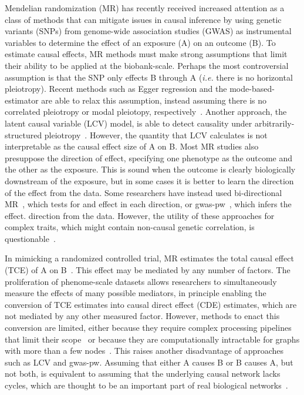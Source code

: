 \documentclass{article}
\begin{document}
Mendelian randomization (MR) has recently received increased attention as a class of methods
that can mitigate issues in causal inference
 by using genetic variants (SNPs) from genome-wide
association studies (GWAS) as instrumental variables to determine the effect
of an exposure (A) on an outcome (B). To estimate causal effects,
MR methods must make strong assumptions that limit their
ability to be applied at the biobank-scale. Perhaps the most
controversial assumption is that the SNP only effects B through A
(\textit{i.e.} there is no horizontal pleiotropy). Recent methods such as Egger
regression and the mode-based-estimator are able to relax this assumption, instead
assuming there is no correlated pleiotropy or modal pleiotopy, respectively~\cite{Bowden2015,Hartwig2017}.
Another approach, the latent causal variable (LCV) model, is able to detect causality
under arbitrarily-structured pleiotropy~\cite{OConnor2018}. However, the quantity that LCV
calculates is not interpretable as the causal effect size of A on B. Most MR studies
also presuppose the direction of effect, specifying one phenotype as the outcome and
the other as the exposure. This is sound when the outcome
is clearly biologically downstream of the exposure, but in some cases it is better
to learn the direction of the effect from the data.
Some researchers have instead used bi-directional MR~\cite{Timpson2011}, which tests for
and effect in each direction, or gwas-pw~\cite{Pickrell2016}, which infers the effect.
direction from the data.
However, the utility of these approaches for complex traits,
which might contain non-causal genetic correlation,
is questionable~\cite{OConnor2018}.

In mimicking a randomized controlled trial, MR estimates the
total causal effect (TCE) of A on B~\cite{Burgess2015}. This effect may be mediated by
any number of factors. The proliferation of phenome-scale datasets
allows researchers to simultaneously measure the effects of many possible mediators,
in principle enabling the conversion of TCE estimates into causal direct effect (CDE) 
estimates, which are not mediated by any other measured factor.
However, methods to enact this conversion are limited, either because they require complex
processing pipelines that limit their scope~\cite{Amar2019} or because they are
computationally intractable for graphs with more than a few nodes~\cite{Badsha2019}.
This raises another disadvantage of approaches such as LCV and gwas-pw. Assuming that either
A causes B or B causes A, but not both, is equivalent to assuming
that the underlying causal network
lacks cycles, which are thought to be an important part of real biological networks~\cite{Zhu2007}.
\end{document}

